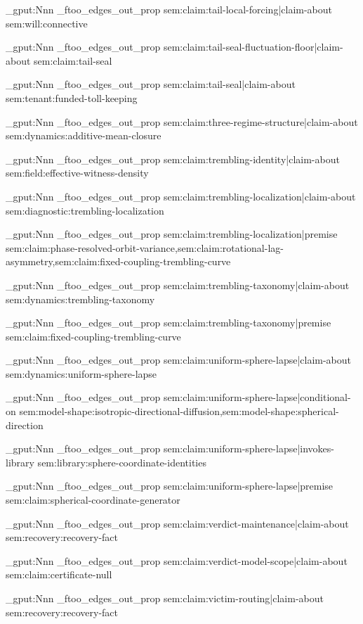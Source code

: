 \prop_gput:Nnn \g_ftoo_edges_out_prop { sem:claim:tail-local-forcing|claim-about } { sem:will:connective }

\prop_gput:Nnn \g_ftoo_edges_out_prop { sem:claim:tail-seal-fluctuation-floor|claim-about } { sem:claim:tail-seal }

\prop_gput:Nnn \g_ftoo_edges_out_prop { sem:claim:tail-seal|claim-about } { sem:tenant:funded-toll-keeping }

\prop_gput:Nnn \g_ftoo_edges_out_prop { sem:claim:three-regime-structure|claim-about } { sem:dynamics:additive-mean-closure }

\prop_gput:Nnn \g_ftoo_edges_out_prop { sem:claim:trembling-identity|claim-about } { sem:field:effective-witness-density }

\prop_gput:Nnn \g_ftoo_edges_out_prop { sem:claim:trembling-localization|claim-about } { sem:diagnostic:trembling-localization }

\prop_gput:Nnn \g_ftoo_edges_out_prop { sem:claim:trembling-localization|premise } { sem:claim:phase-resolved-orbit-variance,sem:claim:rotational-lag-asymmetry,sem:claim:fixed-coupling-trembling-curve }

\prop_gput:Nnn \g_ftoo_edges_out_prop { sem:claim:trembling-taxonomy|claim-about } { sem:dynamics:trembling-taxonomy }

\prop_gput:Nnn \g_ftoo_edges_out_prop { sem:claim:trembling-taxonomy|premise } { sem:claim:fixed-coupling-trembling-curve }

\prop_gput:Nnn \g_ftoo_edges_out_prop { sem:claim:uniform-sphere-lapse|claim-about } { sem:dynamics:uniform-sphere-lapse }

\prop_gput:Nnn \g_ftoo_edges_out_prop { sem:claim:uniform-sphere-lapse|conditional-on } { sem:model-shape:isotropic-directional-diffusion,sem:model-shape:spherical-direction }

\prop_gput:Nnn \g_ftoo_edges_out_prop { sem:claim:uniform-sphere-lapse|invokes-library } { sem:library:sphere-coordinate-identities }

\prop_gput:Nnn \g_ftoo_edges_out_prop { sem:claim:uniform-sphere-lapse|premise } { sem:claim:spherical-coordinate-generator }

\prop_gput:Nnn \g_ftoo_edges_out_prop { sem:claim:verdict-maintenance|claim-about } { sem:recovery:recovery-fact }

\prop_gput:Nnn \g_ftoo_edges_out_prop { sem:claim:verdict-model-scope|claim-about } { sem:claim:certificate-null }

\prop_gput:Nnn \g_ftoo_edges_out_prop { sem:claim:victim-routing|claim-about } { sem:recovery:recovery-fact }

